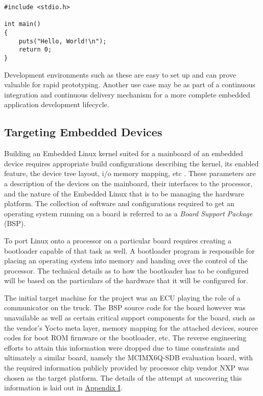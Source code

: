 \begin{verbatim}
#include <stdio.h>

int main()
{
	puts("Hello, World!\n");
	return 0;
}
\end{verbatim}

Development environments such as these are easy to set up and can prove valuable for rapid prototyping. Another use case may be as part of a continuous integration and continuous delivery mechanism for a more complete embedded application development lifecycle.

\subsection{Targeting Embedded Devices}

Building an Embedded Linux kernel suited for a mainboard of an embedded device requires appropriate build configurations describing the kernel, its enabled feature, the device tree layout, i/o memory mapping, etc \cite{bootlin-port}. These parameters are a description of the devices on the mainboard, their interfaces to the processor, and the nature of the Embedded Linux that is to be managing the hardware platform. The collection of software and configurations required to get an operating system running on a board is referred to as a \textit{Board Support Package} (BSP).


To port Linux onto a processor on a particular board requires creating a bootloader capable of that task as well. A bootloader program is responsible for placing an operating system into memory and handing over the control of the processor. The technical details as to how the bootloader has to be configured will be based on the particulars of the hardware that it will be configured for.

The initial target machine for the project was an ECU playing the role of a communicator on the truck. The BSP source code for the board however was unavailable as well as certain critical support components for the board, such as the vendor's Yocto meta layer, memory mapping for the attached devices, source codes for boot ROM firmware or the bootloader, etc. The reverse engineering efforts to attain this information were dropped due to time constraints and ultimately a similar board, namely the MCIMX6Q-SDB evaluation board, with the required information publicly provided by processor chip vendor NXP was chosen as the target platform. The details of the attempt at uncovering this information is laid out in \hyperref[rtc-c300]{Appendix I}.

